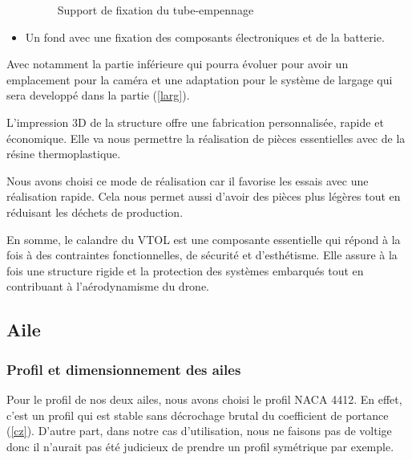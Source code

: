 \documentclass[a4paper,12pt,french]{report}
\begin{document}
\begin{itemize}
\begin{figure}[h]
              \caption{Support de fixation du tube-empennage}
          \end{figure}
          \newpage
    \item Un fond avec une fixation des composants électroniques et de la batterie.
\end{itemize}

Avec notamment la partie inférieure qui pourra évoluer pour avoir un emplacement pour la caméra et une adaptation pour le système de largage qui sera developpé dans la partie (\ref{larg}).\newline

L'impression 3D de la structure offre une fabrication personnalisée, rapide et économique. Elle va nous permettre la réalisation de pièces essentielles avec de la résine thermoplastique.

Nous avons choisi ce mode de réalisation car il favorise les essais avec une réalisation rapide. Cela nous permet aussi d’avoir des pièces plus légères tout en réduisant les déchets de production.\newline

En somme, le calandre du VTOL est une composante essentielle qui répond à la fois à des contraintes fonctionnelles, de sécurité et d'esthétisme. Elle assure à la fois une structure rigide et la protection des systèmes embarqués tout en contribuant à l'aérodynamisme du drone.


\subsection{Aile}

\subsubsection*{Profil et dimensionnement des ailes}

Pour le profil de nos deux ailes, nous avons choisi le profil NACA 4412. En effet, c'est un profil qui est stable sans décrochage brutal du coefficient de portance (\ref{cz}). D'autre part, dans notre cas d'utilisation, nous ne faisons pas de voltige donc il n'aurait pas été judicieux de prendre un profil symétrique par exemple.\newline
\end{document}
